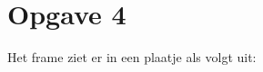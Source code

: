 \documentclass[a4paper,11pt]{article}
\begin{document}











\section*{Opgave 4}

Het frame ziet er in een plaatje als volgt uit:\\[1em]

\\[1em]
\end{document}
